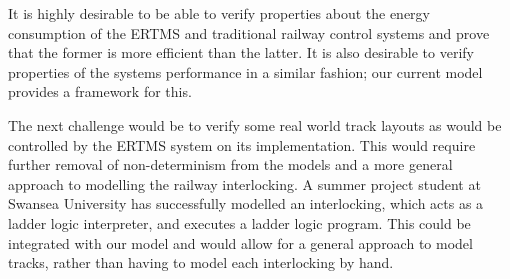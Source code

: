 It is highly desirable to be able to verify properties about the energy consumption of the ERTMS and traditional railway control systems and prove that the former is more efficient than the latter. It is also desirable to verify properties of the systems performance in a similar fashion; our current model provides a framework for this.

The next challenge would be to verify  some real world track layouts as would be controlled by the ERTMS system on its implementation. This would require further removal of non-determinism from the models and a more general approach to modelling the railway interlocking. A summer project student at Swansea University has successfully modelled an interlocking, which acts as a ladder logic interpreter, and executes a ladder logic program. This could be integrated with our model and would allow for a general approach to model tracks, rather than having to model each interlocking by hand.

